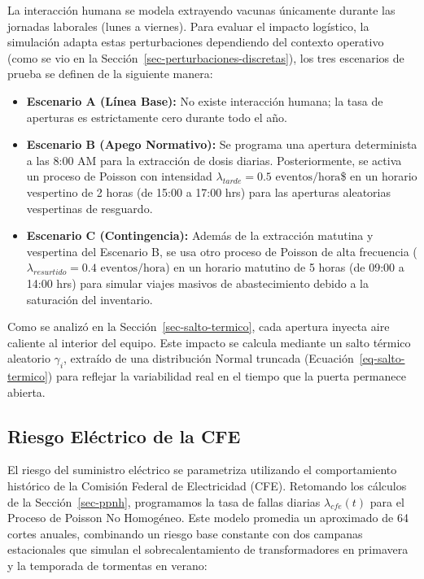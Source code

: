 \documentclass[
  spanish,
  us-letterpaper,
]{scrreprt}
\providecommand{\tightlist}{%
  \setlength{\itemsep}{0pt}\setlength{\parskip}{0pt}}
\numberwithin{equation}{section}
\theoremstyle{plain}
\theoremstyle{plain}
\theoremstyle{plain}
\theoremstyle{definition}
\theoremstyle{remark}
\begin{document}
La interacción humana se modela extrayendo vacunas únicamente durante
las jornadas laborales (lunes a viernes). Para evaluar el impacto
logístico, la simulación adapta estas perturbaciones dependiendo del
contexto operativo (como se vio en la
Sección~\ref{sec-perturbaciones-discretas}), los tres escenarios de
prueba se definen de la siguiente manera:

\begin{itemize}
\tightlist
\item
  \textbf{Escenario A (Línea Base):} No existe interacción humana; la
  tasa de aperturas es estrictamente cero durante todo el año.
\item
  \textbf{Escenario B (Apego Normativo):} Se programa una apertura
  determinista a las 8:00 AM para la extracción de dosis diarias.
  Posteriormente, se activa un proceso de Poisson con intensidad
  \(\lambda_{tarde} = 0.5 \text{ eventos/hora}\)\$ en un horario
  vespertino de 2 horas (de 15:00 a 17:00 hrs) para las aperturas
  aleatorias vespertinas de resguardo.
\item
  \textbf{Escenario C (Contingencia):} Además de la extracción matutina
  y vespertina del Escenario B, se usa otro proceso de Poisson de alta
  frecuencia (\(\lambda_{resurtido} = 0.4 \text{ eventos/hora}\)) en un
  horario matutino de 5 horas (de 09:00 a 14:00 hrs) para simular viajes
  masivos de abastecimiento debido a la saturación del inventario.
\end{itemize}

Como se analizó en la Sección~\ref{sec-salto-termico}, cada apertura
inyecta aire caliente al interior del equipo. Este impacto se calcula
mediante un salto térmico aleatorio \(\gamma_i\), extraído de una
distribución Normal truncada (Ecuación~\ref{eq-salto-termico}) para
reflejar la variabilidad real en el tiempo que la puerta permanece
abierta.

\subsection{Riesgo Eléctrico de la CFE}\label{sec-riesgo-cfe}

El riesgo del suministro eléctrico se parametriza utilizando el
comportamiento histórico de la Comisión Federal de Electricidad (CFE).
Retomando los cálculos de la Sección~\ref{sec-ppnh}, programamos la tasa
de fallas diarias \(\lambda_{cfe}(t)\) para el Proceso de Poisson No
Homogéneo. Este modelo promedia un aproximado de 64 cortes anuales,
combinando un riesgo base constante con dos campanas estacionales que
simulan el sobrecalentamiento de transformadores en primavera y la
temporada de tormentas en verano:
\end{document}
